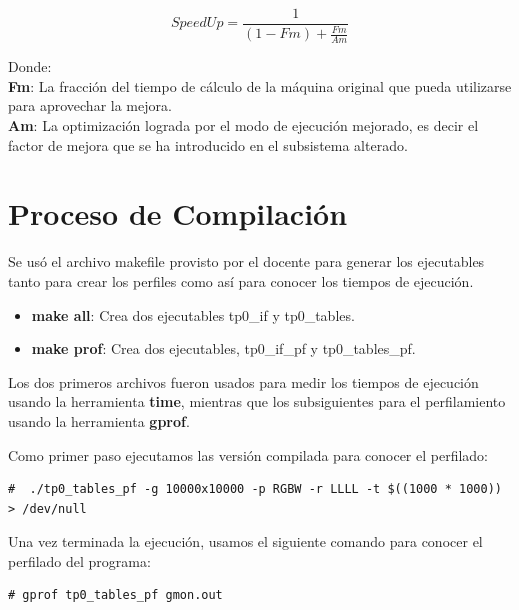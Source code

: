 \documentclass[a4paper, 10pt, twoside, notitlepage]{article}
\begin{document}
\begin{equation}
 SpeedUp =\frac{1}{(1-Fm) + \frac{Fm}{Am}}
\end{equation}

Donde:\\

\textbf{Fm}: La fracción del tiempo de cálculo de la máquina original que pueda utilizarse para aprovechar la mejora.\\

\textbf{Am}: La optimización lograda por el modo de ejecución mejorado, es decir el factor de mejora que se ha introducido en el subsistema alterado.


\newpage

\section{Proceso de Compilación}

Se usó el archivo makefile provisto por el docente para generar los ejecutables tanto para crear los perfiles como así para conocer los tiempos de ejecución.\\

\begin{itemize} 
\item[] \textbf{make all}: Crea dos ejecutables tp0\_if y tp0\_tables.
 \item[] \textbf{make prof}: Crea dos ejecutables, tp0\_if\_pf y tp0\_tables\_pf.
\end{itemize}

Los dos primeros archivos fueron usados para medir los tiempos de ejecución usando la herramienta \textbf{time}, mientras que los subsiguientes para el perfilamiento usando la herramienta \textbf{gprof}.

Como primer paso ejecutamos las versión compilada para conocer el perfilado:
\scriptsize
\begin{verbatim}
#  ./tp0_tables_pf -g 10000x10000 -p RGBW -r LLLL -t $((1000 * 1000)) > /dev/null
\end{verbatim}
\normalsize

Una vez terminada la ejecución, usamos el siguiente comando para conocer el perfilado del programa:

\scriptsize
\begin{verbatim}
# gprof tp0_tables_pf gmon.out
\end{verbatim}
\normalsize
\end{document}
